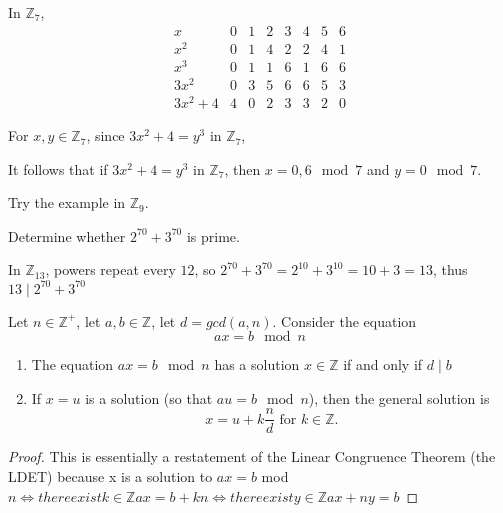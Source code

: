 \begin{solution}
In $\mathbb{Z}_7$, \[
\begin{array}{cccccccc}
    x & 0 & 1 & 2 & 3 & 4 & 5 & 6 \\
    x^2 & 0 & 1 & 4 & 2 & 2 & 4 & 1 \\
    x^3 & 0 & 1 & 1 & 6 & 1 & 6 & 6 \\
    3x^2 & 0 & 3 & 5 & 6 & 6 & 5 & 3 \\
    3x^2+4 & 4 & 0 & 2 & 3 & 3 & 2 & 0
\end{array}\]

For $x,y\in\mathbb{Z}_7$, since $3x^2 +4 = y^3$ in $\mathbb{Z}_7$, \

It follows that if $3x^2 +4 = y^3$ in $\mathbb{Z}_7$, then $x=0,6 \mod 7$ and $y=0 \mod 7$.
\end{solution}

\begin{exer}
Try the example in $\mathbb{Z}_9$.
\end{exer}

\begin{exmp}
Determine whether $2^{70}+3^{70}$ is prime.
\end{exmp}
\begin{solution}
In $\mathbb{Z}_{13}$, powers repeat every $12$, so $2^{70}+3^{70} = 2^{10} + 3^{10} = 10 + 3 = 13$, thus $13 \mid 2^{70}+3^{70}$
\end{solution}

\begin{thm}
Let $n\in\mathbb{Z}^+$, let $a,b\in\mathbb{Z}$, let $d = gcd(a,n)$. Consider the equation \[ax =b \mod n\]
\begin{enumerate}
\item The equation $ax = b\mod n$ has a solution $x\in\mathbb{Z}$ if and only if $d\mid b$
\item If $x = u$ is a solution (so that $au =b \mod n$), then the general solution is \[x = u + k\frac{n}{d} \text{ for } k\in\mathbb{Z}.\]
\end{enumerate}
\end{thm}

\begin{proof}
This is essentially a restatement of the Linear Congruence Theorem (the LDET) because x is a solution to $ax=b$ mod $n \iff there exist k \in \mathbb{Z} ax=b+kn \iff there exist y \in \mathbb{Z} ax+ny=b$
\end{proof}

